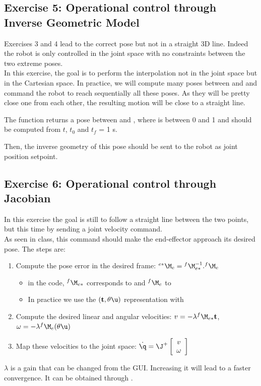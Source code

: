 \documentclass{ecnreport}
\begin{document}
  
  \subsection*{Exercise 5: Operational control through Inverse Geometric Model}
  
  Exercises 3 and 4 lead to the correct pose but not in a straight 3D line. Indeed the robot is only controlled in the joint space with no constraints between the two extreme poses.\\
  In this exercise, the goal is to perform the interpolation not in the joint space but in the Cartesian space. In practice, we will compute many poses between 
   and  and command the robot to reach sequentially all these poses. As they will be pretty close one from each other, the resulting motion
  will be close to a straight line.
  
  The  function returns a pose between  and , where  is between 0 and 1 and should be computed from $t$, $t_0$ and $t_f$ = 1 s.
  
  Then, the inverse geometry of this pose should be sent to the robot as joint position setpoint.
  
  \newpage
  \subsection*{Exercise 6: Operational control through Jacobian}
  
  In this exercise the goal is still to follow a straight line between the two points, but this time by sending a joint velocity command.\\
  
  As seen in class, this command should make the end-effector approach its desired pose. The steps are:
  \begin{enumerate}
    \item Compute the pose error in the desired frame: ${}^{e*}\M_e = {}^{f}\M_{e*}^{-1}.{}^{f}\M_e$
    \begin{itemize}
      \item in the code, ${}^{f}\M_{e*}$ corresponds to  and ${}^{f}\M_e$ to 
      \item In practice we use the $(\mathbf{t}, \theta\u)$ representation with 
    \end{itemize}
    \item Compute the desired linear and angular velocities: $v = -\lambda{}^{f}\M_{e*}\mathbf{t}$, \quad $\omega = -\lambda{}^{f}\M_{e} (\theta\u)$
    \item Map these velocities to the joint space: $\dot\q = \J^+ \left[\begin{array}{c}v\\\omega\end{array}\right]$
  \end{enumerate}
  $\lambda$ is a gain that can be changed from the GUI. Increasing it will lead to a faster convergence. It can be obtained through .
  
\end{document}
